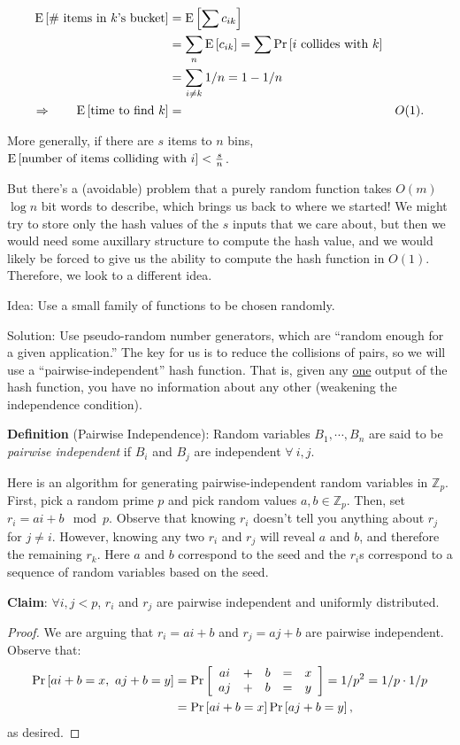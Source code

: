\documentclass{article}
\renewcommand{\Pr}[1]{\textnormal{Pr}\left[ #1 \right]}
\newcommand{\E}[1]{\textnormal{E}\left[ #1 \right]}
\begin{document}
\begin{align*}
  \E{\hbox{\# items in $k$'s bucket}} & = \E{\sum c_{ik}}
  \\
  & = \sum_n \E{ c_{ik} } = \sum \Pr{i\hbox{ collides with } k} \\
  & = \sum_{i \not= k} 1/n = 1 - 1/n \\
  \Rightarrow \qquad \E{\hbox{time to find } k}  & = & O(1).
\end{align*}

More generally, if there are $s$ items to $n$ bins, $\E{\hbox{number of items colliding with }i} < \frac{s}{n}$.

But there's a (avoidable) problem that a purely random function takes $O(m)$ $\log n$ bit words to describe, 
which brings us back to where we started!
We might try to store only the hash values of the $s$ inputs that we care about, but then we would need
some auxillary structure to compute the hash value, and we would likely be forced to give us the ability
to compute the hash function in $O(1)$. Therefore, we look to a different idea.

Idea: Use a small family of functions to be chosen randomly.

Solution: Use pseudo-random number generators, which are ``random enough for a given application.''  The key for us is to reduce the collisions of pairs, so we will use a ``pairwise-independent'' hash function.  That is, given any \underline{one} output of the hash function, you have no information about any other (weakening the independence condition).

\textbf{Definition} (Pairwise Independence): Random variables $B_1, \cdots, B_n$ are said to be \emph{pairwise independent} if $B_i$ and $B_j$ are independent $\forall\ i, j$.

Here is an algorithm for generating pairwise-independent random variables in
${\mathbb Z}_p$.  First, pick a random prime $p$ and pick random values $a, b
\in {\mathbb Z}_p$.  Then, set $r_i = ai + b \mod p$.  Observe that
knowing $r_i$ doesn't tell you anything about $r_j$ for $j \not= i$.  However,
knowing any two $r_i$ and $r_j$ will reveal $a$ and $b$, and therefore the
remaining $r_k$.  Here $a$ and $b$ correspond to the seed and the $r_i$s
correspond to a sequence of random variables based on the seed.

\textbf{Claim}:
$\forall i,j < p$, $r_i$ and $r_j$ are pairwise independent and uniformly distributed.

\begin{proof}
We are arguing that $r_i = ai + b$ and $r_j = aj + b$ are pairwise independent.  Observe that:
\begin{align*}
  \Pr{ai+b = x,\ aj+b = y} & =
  \Pr{
  \begin{array}{ccccc}
    a i & + & b & = & x \\
    a j & + & b & = & y 
  \end{array}
  }
  = 1/p^2 = 1/p \cdot 1/p \\
  & = \Pr{ai+b = x}\Pr{aj+b = y},
\end{align*}
as desired. \hfill
\end{proof}
\end{document}
